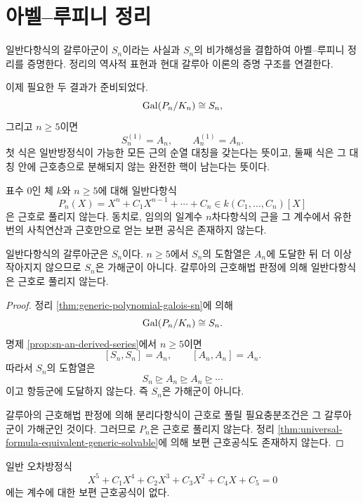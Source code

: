 \clearpage
\section{아벨--루피니 정리}
\label{sec:abel-ruffini-theorem}

\begin{learninggoal}
일반다항식의 갈루아군이 $S_n$이라는 사실과 $S_n$의 비가해성을 결합하여 아벨--루피니 정리를 증명한다. 정리의 역사적 표현과 현대 갈루아 이론의 증명 구조를 연결한다.
\end{learninggoal}

이제 필요한 두 결과가 준비되었다.
\[
  \operatorname{Gal}(P_n/K_n)\cong S_n,
\]
그리고 $n\ge5$이면
\[
  S_n^{(1)}=A_n,
  \qquad
  A_n^{(1)}=A_n.
\]
첫 식은 일반방정식이 가능한 모든 근의 순열 대칭을 갖는다는 뜻이고, 둘째 식은 그 대칭 안에 근호층으로 분해되지 않는 완전한 핵이 남는다는 뜻이다.

\begin{theorem}[아벨--루피니]
\label{thm:abel-ruffini}
표수 $0$인 체 $k$와 $n\ge5$에 대해 일반다항식
\[
  P_n(X)=X^n+C_1X^{n-1}+\cdots+C_n
  \in k(C_1,\dots,C_n)[X]
\]
은 근호로 풀리지 않는다. 동치로, 임의의 일계수 $n$차다항식의 근을 그 계수에서 유한번의 사칙연산과 근호만으로 얻는 보편 공식은 존재하지 않는다.
\end{theorem}

\begin{proofidea}
일반다항식의 갈루아군은 $S_n$이다. $n\ge5$에서 $S_n$의 도함열은 $A_n$에 도달한 뒤 더 이상 작아지지 않으므로 $S_n$은 가해군이 아니다. 갈루아의 근호해법 판정에 의해 일반다항식은 근호로 풀리지 않는다.
\end{proofidea}

\begin{proof}
정리 \ref{thm:generic-polynomial-galois-sn}에 의해
\[
  \operatorname{Gal}(P_n/K_n)\cong S_n.
\]
명제 \ref{prop:sn-an-derived-series}에서 $n\ge5$이면
\[
  [S_n,S_n]=A_n,
  \qquad
  [A_n,A_n]=A_n.
\]
따라서 $S_n$의 도함열은
\[
  S_n\trianglerighteq A_n\trianglerighteq A_n
  \trianglerighteq\cdots
\]
이고 항등군에 도달하지 않는다. 즉 $S_n$은 가해군이 아니다.

갈루아의 근호해법 판정에 의해 분리다항식이 근호로 풀릴 필요충분조건은 그 갈루아군이 가해군인 것이다. 그러므로 $P_n$은 근호로 풀리지 않는다. 정리 \ref{thm:universal-formula-equivalent-generic-solvable}에 의해 보편 근호공식도 존재하지 않는다.
\end{proof}

\begin{corollary}[일반 오차방정식]
\label{cor:generic-quintic-no-radical-formula}
일반 오차방정식
\[
  X^5+C_1X^4+C_2X^3+C_3X^2+C_4X+C_5=0
\]
에는 계수에 대한 보편 근호공식이 없다.
\end{corollary}

